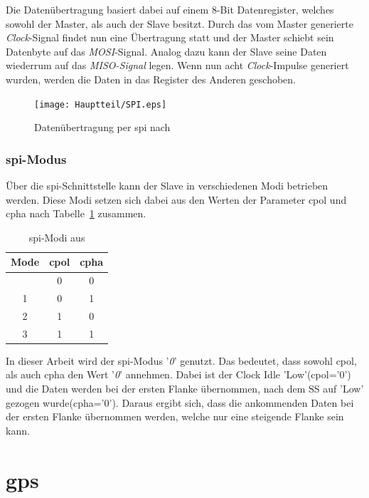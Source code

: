 Die Datenübertragung basiert dabei auf einem 8-Bit Datenregister, welches sowohl der Master, als auch der
Slave besitzt. Durch das vom Master generierte \emph{Clock}-Signal findet nun eine Übertragung statt und
der Master schiebt sein Datenbyte auf das \emph{MOSI}-Signal. Analog dazu kann der Slave seine Daten
wiederrum auf das \emph{MISO-Signal} legen. Wenn nun acht \emph{Clock}-Impulse generiert wurden,
werden die Daten in das Register des Anderen geschoben. \cite{spipdf}

\begin{figure}[h!]
\centering
\texttt{[image: Hauptteil/SPI.eps]}
\caption{Datenübertragung per \ac{spi} nach \cite{spipic} }
\label{fig:spi}
\end{figure}

\newpage
\subsubsection{\ac{spi}-Modus}\label{kap:spimode}

Über die \ac{spi}-Schnittstelle kann der Slave in verschiedenen Modi betrieben werden. Diese Modi setzen
sich dabei aus den Werten der Parameter \ac{cpol} und \ac{cpha} nach Tabelle~\ref{tab:spimode} zusammen.

\begin{table}[h]
\centering
\begin{tabular}{c|c|c}
\toprule
\textbf{Mode} & \textbf{\ac{cpol}} & \textbf{\ac{cpha}}   \\
\midrule
\centering
0 & 0 & 0 \\
\hline
1 & 0 & 1 \\
\hline
2 & 1 & 0 \\
\hline
3 & 1 & 1 \\
\bottomrule
\end{tabular}
\caption{\ac{spi}-Modi aus \cite{spimode}}
\label{tab:spimode}
\end{table}

 In dieser Arbeit wird der \ac{spi}-Modus '\emph{0}' genutzt. Das bedeutet, dass sowohl \ac{cpol}, als auch
\ac{cpha} den Wert '\emph{0}' annehmen. Dabei ist der Clock Idle 'Low'(\ac{cpol}='0') und die Daten werden bei der
ersten Flanke übernommen, nach dem SS auf 'Low' gezogen wurde(\ac{cpha}='0'). Daraus ergibt sich,
dass die ankommenden Daten bei der ersten Flanke übernommen werden, welche nur eine steigende Flanke sein kann.
\cite{schnittstelle}


\section{\ac{gps}}\label{kap:gps}

